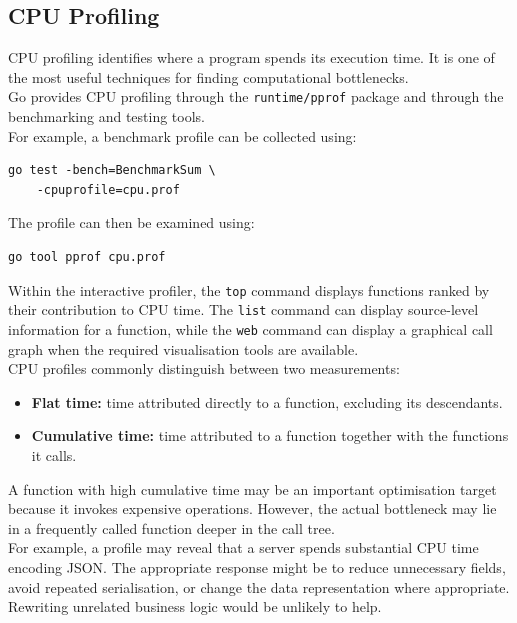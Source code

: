 \subsection{CPU Profiling}

CPU profiling identifies where a program spends its execution time. It is one of the most useful techniques for finding computational bottlenecks.\\

Go provides CPU profiling through the \texttt{runtime/pprof} package and through the benchmarking and testing tools.\\

For example, a benchmark profile can be collected using:

\begin{lstlisting}
go test -bench=BenchmarkSum \
    -cpuprofile=cpu.prof
\end{lstlisting}

The profile can then be examined using:

\begin{lstlisting}
go tool pprof cpu.prof
\end{lstlisting}

Within the interactive profiler, the \texttt{top} command displays functions ranked by their contribution to CPU time. The \texttt{list} command can display source-level information for a function, while the \texttt{web} command can display a graphical call graph when the required visualisation tools are available.\\

CPU profiles commonly distinguish between two measurements:

\begin{itemize}
    \item \textbf{Flat time:} time attributed directly to a function, excluding its descendants.
    \item \textbf{Cumulative time:} time attributed to a function together with the functions it calls.
\end{itemize}

A function with high cumulative time may be an important optimisation target because it invokes expensive operations. However, the actual bottleneck may lie in a frequently called function deeper in the call tree.\\

For example, a profile may reveal that a server spends substantial CPU time encoding JSON. The appropriate response might be to reduce unnecessary fields, avoid repeated serialisation, or change the data representation where appropriate. Rewriting unrelated business logic would be unlikely to help.\\

